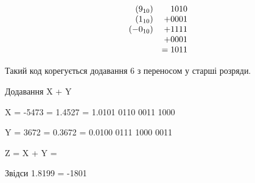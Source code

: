 \documentclass[12pt,a4paper]{article}
\begin{document}
    \[
        \begin{array}{r@{\quad}r}
        (9_{10})    & 1010 \\
        (1_{10})    & +0001 \\
        (-0_{10})   & +1111 \\
                    & +0001 \\
                    & =1011 \\
        \end{array}
    \]

    Такий код корегується додавання 6 з переносом у старші розряди.

    \begin{center}
        \large Додавання X + Y
    \end{center}

    X = -5473 = 1.4527 = 1.0101 0110 0011 1000

    Y = 3672 = 0.3672 = 0.0100 0111 1000 0011

    Z = X + Y = 

    \vspace{1em}


    \vspace{1em}

    Звідси 1.8199 = -1801

    \newpage
\end{document}
